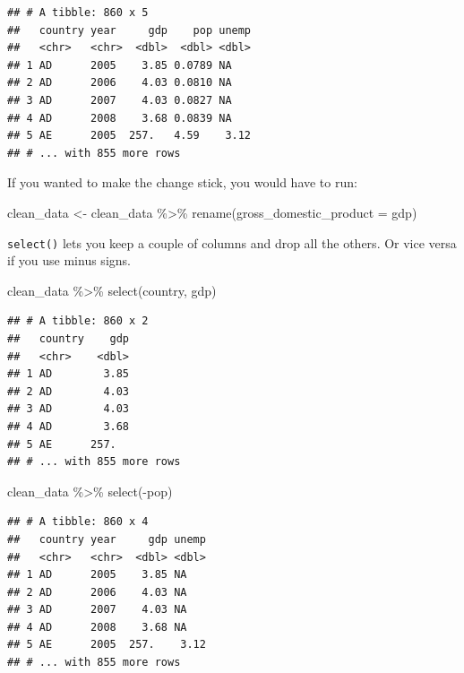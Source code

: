 \documentclass[
  12pt,
  oneside,openany]{book}
\newenvironment{Shaded}{\begin{snugshade}}{\end{snugshade}}
\newcommand{\AttributeTok}[1]{\textcolor[rgb]{0.77,0.63,0.00}{#1}}
\newcommand{\FunctionTok}[1]{\textcolor[rgb]{0.00,0.00,0.00}{#1}}
\newcommand{\NormalTok}[1]{#1}
\newcommand{\OtherTok}[1]{\textcolor[rgb]{0.56,0.35,0.01}{#1}}
\newcommand{\SpecialCharTok}[1]{\textcolor[rgb]{0.00,0.00,0.00}{#1}}
\begin{document}
\begin{verbatim}
## # A tibble: 860 x 5
##   country year     gdp    pop unemp
##   <chr>   <chr>  <dbl>  <dbl> <dbl>
## 1 AD      2005    3.85 0.0789 NA   
## 2 AD      2006    4.03 0.0810 NA   
## 3 AD      2007    4.03 0.0827 NA   
## 4 AD      2008    3.68 0.0839 NA   
## 5 AE      2005  257.   4.59    3.12
## # ... with 855 more rows
\end{verbatim}

If you wanted to make the change stick, you would have to run:

\begin{Shaded}
\begin{Highlighting}[]
\NormalTok{clean\_data }\OtherTok{\textless{}{-}}\NormalTok{ clean\_data }\SpecialCharTok{\%\textgreater{}\%}
  \FunctionTok{rename}\NormalTok{(}\AttributeTok{gross\_domestic\_product =}\NormalTok{ gdp)}
\end{Highlighting}
\end{Shaded}

\texttt{select()} lets you keep a couple of columns and drop all the others. Or vice versa if you use minus signs.

\begin{Shaded}
\begin{Highlighting}[]
\NormalTok{clean\_data }\SpecialCharTok{\%\textgreater{}\%}
  \FunctionTok{select}\NormalTok{(country, gdp)}
\end{Highlighting}
\end{Shaded}

\begin{verbatim}
## # A tibble: 860 x 2
##   country    gdp
##   <chr>    <dbl>
## 1 AD        3.85
## 2 AD        4.03
## 3 AD        4.03
## 4 AD        3.68
## 5 AE      257.  
## # ... with 855 more rows
\end{verbatim}

\begin{Shaded}
\begin{Highlighting}[]
\NormalTok{clean\_data }\SpecialCharTok{\%\textgreater{}\%}
  \FunctionTok{select}\NormalTok{(}\SpecialCharTok{{-}}\NormalTok{pop)}
\end{Highlighting}
\end{Shaded}

\begin{verbatim}
## # A tibble: 860 x 4
##   country year     gdp unemp
##   <chr>   <chr>  <dbl> <dbl>
## 1 AD      2005    3.85 NA   
## 2 AD      2006    4.03 NA   
## 3 AD      2007    4.03 NA   
## 4 AD      2008    3.68 NA   
## 5 AE      2005  257.    3.12
## # ... with 855 more rows
\end{verbatim}
\end{document}

